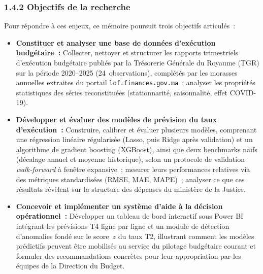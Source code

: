 \subsubsection*{1.4.2 \quad Objectifs de la recherche}

Pour r\'epondre \`a ces enjeux, ce m\'emoire poursuit trois objectifs articul\'es~:

\begin{itemize}
    \item \textbf{Constituer et analyser une base de donn\'ees d'ex\'ecution budg\'etaire~:}
    Collecter, nettoyer et structurer les rapports trimestriels d'ex\'ecution budg\'etaire publi\'es par la Tr\'esorerie G\'en\'erale du Royaume (TGR) sur la p\'eriode 2020--2025 (24~observations), compl\'et\'es par les morasses annuelles extraites du portail \texttt{lof.finances.gov.ma}~; analyser les propri\'et\'es statistiques des s\'eries reconstitu\'ees (stationnarit\'e, saisonnalit\'e, effet COVID-19).

    \item \textbf{D\'evelopper et \'evaluer des mod\`eles de pr\'evision du taux d'ex\'ecution~:}
    Construire, calibrer et \'evaluer plusieurs mod\`eles, comprenant une r\'egression lin\'eaire r\'egularis\'ee (Lasso, puis Ridge apr\`es validation) et un algorithme de gradient boosting (XGBoost), ainsi que deux benchmarks na\"\i fs (d\'ecalage annuel et moyenne historique), selon un protocole de validation \textit{walk-forward} \`a fen\^etre expansive~; mesurer leurs performances relatives via des m\'etriques standardis\'ees (RMSE, MAE, MAPE)~; analyser ce que ces r\'esultats r\'ev\`elent sur la structure des d\'epenses du minist\`ere de la Justice.

    \item \textbf{Concevoir et impl\'ementer un syst\`eme d'aide \`a la d\'ecision op\'erationnel~:}
    D\'evelopper un tableau de bord interactif sous Power BI int\'egrant les pr\'evisions T4 ligne par ligne et un module de d\'etection d'anomalies fond\'e sur le score~$z$ du taux T2, illustrant comment les mod\`eles pr\'edictifs peuvent \^etre mobilis\'es au service du pilotage budg\'etaire courant et formuler des recommandations concr\`etes pour leur appropriation par les \'equipes de la Direction du Budget.
\end{itemize}

